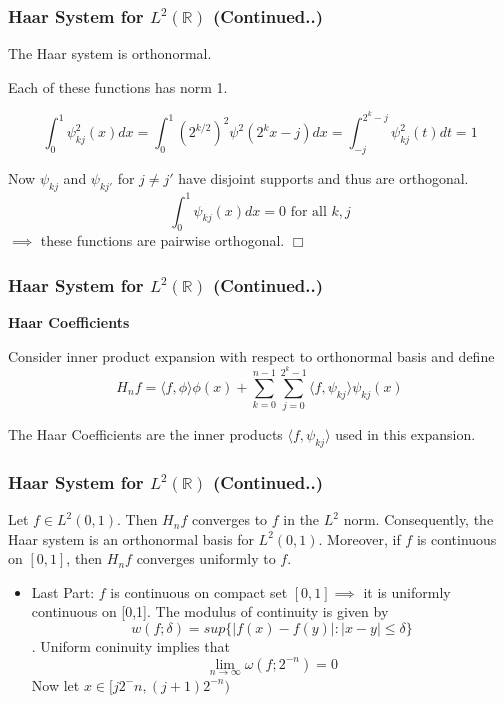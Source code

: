 \documentclass{beamer}
\newcommand{\qedwhite}{\hfill \ensuremath{\Box}}
\begin{document}
\begin{frame}
\frametitle{Haar System for  $L^2\left({\mathbb{R}}\right)$ (Continued..)}

\begin{lemma}[15.2.1]
    The Haar system is orthonormal.
\end{lemma}


Each of these functions has norm 1. 

$$\int_0^1\psi_{kj}^2(x)dx = \int_0^1 (2^{k/2})^2\psi^2(2^kx-j)dx = \int_{-j}^{2^k-j} \psi_{kj}^2(t)dt = 1$$


Now $\psi_{kj}$ and $\psi_{kj'}$ for $j \ne j'$ have disjoint supports and thus are orthogonal. 
$$\int_0^1\psi_{kj}(x)dx = 0 \text{ for all } k, j$$
$\implies$ these functions are pairwise orthogonal.
\qedwhite
\end{frame}

\begin{frame}
\frametitle{Haar System for  $L^2\left({\mathbb{R}}\right)$ (Continued..)}
\textbf{Haar Coefficients}
\linebreak

Consider inner product expansion with respect to orthonormal basis and define
    $$H_nf = \langle f, \phi\rangle \phi(x) + \sum_{k=0}^{n-1}  \sum_{j=0}^{2^k-1} \langle f, \psi_{kj}\rangle \psi_{kj}(x)$$

The Haar Coefficients are the inner products $\langle f, \psi_{kj}\rangle$ used in this expansion.
\end{frame}

\begin{frame}
    \frametitle{Haar System for  $L^2\left({\mathbb{R}}\right)$ (Continued..)}

\begin{theorem}[15.2.3]
    Let $f \in L^2(0,1)$. Then $H_nf$ converges to $f$ in the $L^2$ norm.
    Consequently, the Haar system is an orthonormal basis for $L^2(0,1)$. 
    Moreover, if $f$ is continuous on $[0, 1]$, then $H_nf$ converges uniformly to $f$.
\end{theorem}


\begin{itemize}
    \item Last Part: $f$ is continuous on compact set $[0,1] \implies$ it is uniformly continuous on [0,1].
    The modulus of continuity is  given  by $$w(f;\delta)  = sup\{|f(x)-f(y)| : |x - y| \le \delta\}$$. 
    Uniform coninuity implies that $$\lim_{n \to \infty} \omega(f;2^{-n})=0$$
    Now let $x \in [j2^-n, (j+1)2^{-n})$
\end{itemize}

\end{frame}
\end{document}
